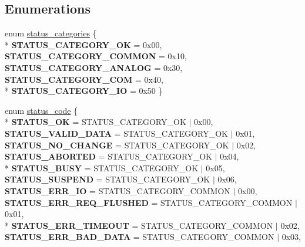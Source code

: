 \subsection*{Enumerations}
\begin{DoxyCompactItemize}
\item 
enum \hyperlink{group__group__sam0__utils__status__codes_ga477539e8a67b0cab096e8ecda6f5d7d6}{status\+\_\+categories} \{ \\*
{\bfseries S\+T\+A\+T\+U\+S\+\_\+\+C\+A\+T\+E\+G\+O\+R\+Y\+\_\+\+O\+K} = 0x00, 
{\bfseries S\+T\+A\+T\+U\+S\+\_\+\+C\+A\+T\+E\+G\+O\+R\+Y\+\_\+\+C\+O\+M\+M\+O\+N} = 0x10, 
{\bfseries S\+T\+A\+T\+U\+S\+\_\+\+C\+A\+T\+E\+G\+O\+R\+Y\+\_\+\+A\+N\+A\+L\+O\+G} = 0x30, 
{\bfseries S\+T\+A\+T\+U\+S\+\_\+\+C\+A\+T\+E\+G\+O\+R\+Y\+\_\+\+C\+O\+M} = 0x40, 
\\*
{\bfseries S\+T\+A\+T\+U\+S\+\_\+\+C\+A\+T\+E\+G\+O\+R\+Y\+\_\+\+I\+O} = 0x50
 \}
\item 
enum \hyperlink{group__group__sam0__utils__status__codes_ga751c892e5a46b8e7d282085a5a5bf151}{status\+\_\+code} \{ \\*
{\bfseries S\+T\+A\+T\+U\+S\+\_\+\+O\+K} = S\+T\+A\+T\+U\+S\+\_\+\+C\+A\+T\+E\+G\+O\+R\+Y\+\_\+\+O\+K $\vert$ 0x00, 
{\bfseries S\+T\+A\+T\+U\+S\+\_\+\+V\+A\+L\+I\+D\+\_\+\+D\+A\+T\+A} = S\+T\+A\+T\+U\+S\+\_\+\+C\+A\+T\+E\+G\+O\+R\+Y\+\_\+\+O\+K $\vert$ 0x01, 
{\bfseries S\+T\+A\+T\+U\+S\+\_\+\+N\+O\+\_\+\+C\+H\+A\+N\+G\+E} = S\+T\+A\+T\+U\+S\+\_\+\+C\+A\+T\+E\+G\+O\+R\+Y\+\_\+\+O\+K $\vert$ 0x02, 
{\bfseries S\+T\+A\+T\+U\+S\+\_\+\+A\+B\+O\+R\+T\+E\+D} = S\+T\+A\+T\+U\+S\+\_\+\+C\+A\+T\+E\+G\+O\+R\+Y\+\_\+\+O\+K $\vert$ 0x04, 
\\*
{\bfseries S\+T\+A\+T\+U\+S\+\_\+\+B\+U\+S\+Y} = S\+T\+A\+T\+U\+S\+\_\+\+C\+A\+T\+E\+G\+O\+R\+Y\+\_\+\+O\+K $\vert$ 0x05, 
{\bfseries S\+T\+A\+T\+U\+S\+\_\+\+S\+U\+S\+P\+E\+N\+D} = S\+T\+A\+T\+U\+S\+\_\+\+C\+A\+T\+E\+G\+O\+R\+Y\+\_\+\+O\+K $\vert$ 0x06, 
{\bfseries S\+T\+A\+T\+U\+S\+\_\+\+E\+R\+R\+\_\+\+I\+O} = S\+T\+A\+T\+U\+S\+\_\+\+C\+A\+T\+E\+G\+O\+R\+Y\+\_\+\+C\+O\+M\+M\+O\+N $\vert$ 0x00, 
{\bfseries S\+T\+A\+T\+U\+S\+\_\+\+E\+R\+R\+\_\+\+R\+E\+Q\+\_\+\+F\+L\+U\+S\+H\+E\+D} = S\+T\+A\+T\+U\+S\+\_\+\+C\+A\+T\+E\+G\+O\+R\+Y\+\_\+\+C\+O\+M\+M\+O\+N $\vert$ 0x01, 
\\*
{\bfseries S\+T\+A\+T\+U\+S\+\_\+\+E\+R\+R\+\_\+\+T\+I\+M\+E\+O\+U\+T} = S\+T\+A\+T\+U\+S\+\_\+\+C\+A\+T\+E\+G\+O\+R\+Y\+\_\+\+C\+O\+M\+M\+O\+N $\vert$ 0x02, 
{\bfseries S\+T\+A\+T\+U\+S\+\_\+\+E\+R\+R\+\_\+\+B\+A\+D\+\_\+\+D\+A\+T\+A} = S\+T\+A\+T\+U\+S\+\_\+\+C\+A\+T\+E\+G\+O\+R\+Y\+\_\+\+C\+O\+M\+M\+O\+N $\vert$ 0x03, 

\end{DoxyCompactItemize}
